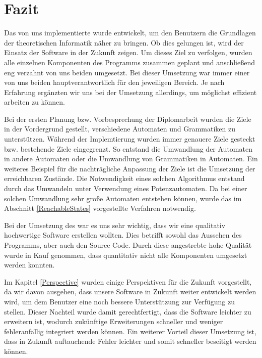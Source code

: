 

\chapter{Fazit}\label{Conclusion}

Das von uns implementierte \gtitool wurde entwickelt, um den Benutzern die
Grundlagen der theoretischen Informatik näher zu bringen. Ob dies gelungen ist,
wird der Einsatz der Software in der Zukunft zeigen. Um dieses Ziel zu verfolgen,
wurden alle einzelnen Komponenten des Programms zusammen geplant und anschließend
eng verzahnt von uns beiden umgesetzt. Bei dieser Umsetzung war immer einer von
uns beiden hauptverantwortlich für den jeweiligen Bereich. Je nach Erfahrung
ergänzten wir uns bei der Umsetzung allerdings, um möglichst effizient arbeiten
zu können.\vspace{10pt}

Bei der ersten Planung bzw. Vorbesprechung der Diplomarbeit wurden die Ziele in
der Vordergrund gestellt, verschiedene Automaten und Grammatiken zu
unterstützen. Während der Implemtierung wurden immer genauere Ziele gesteckt
bzw. bestehende Ziele eingegrenzt. So entstand die Umwandlung der Automaten in
andere Automaten oder die Umwandlung von Grammatiken in Automaten. Ein weiteres
Beispiel für die nachträgliche Anpassung der Ziele ist die Umsetzung der
erreichbaren Zustände. Die Notwendigkeit eines solchen Algorithmus entstand
durch das Umwandeln unter Verwendung eines Potenzautomaten. Da bei einer
solchen Umwandlung sehr große Automaten entstehen können, wurde das im
Abschnitt \ref{ReachableStates} vorgestellte Verfahren notwendig.\vspace{10pt}

Bei der Umsetzung des \gtitools war es uns sehr wichtig, dass wir eine
qualitativ hochwertige Software erstellen wollten. Dies betrifft sowohl das
Aussehen des Programms, aber auch den Source Code. Durch diese angestrebte hohe
Qualität wurde in Kauf genommen, dass quantitativ nicht alle Komponenten
umgesetzt werden konnten.\vspace{10pt}

Im Kapitel \ref{Perspective} wurden einige Perspektiven für die Zukunft
vorgestellt, da wir davon ausgehen, dass unsere Software in Zukunft weiter
entwickelt werden wird, um dem Benutzer eine noch bessere Unterstützung zur
Verfügung zu stellen. Dieser Nachteil wurde damit gerechtfertigt, dass die
Software leichter zu erweitern ist, wodurch zukünftige Erweiterungen schneller
und weniger fehleranfällig integriert werden können. Ein weiterer Vorteil dieser
Umsetzung ist, dass in Zukunft auftauchende Fehler leichter und somit schneller
beseitigt werden können.\vspace{10pt}

